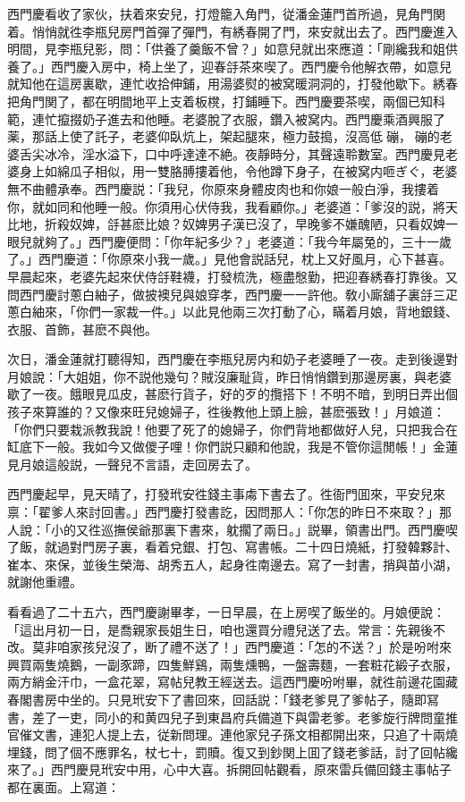 西門慶看收了家伙，扶着來安兒，打燈籠入角門，従潘金蓮門首所過，見角門関着。悄悄就徃李瓶兒房門首彈了彈門，有綉春開了門，來安就出去了。西門慶進入明間，見李瓶兒影，問：「供養了羹飯不曾？」如意兒就出來應道：「剛纔我和姐供養了。」西門慶入房中，椅上坐了，迎春㧱茶來喫了。西門慶令他解衣帶，如意兒就知他在這房裏歇，連忙收拾伸鋪，用湯婆熨的被窝暖洞洞的，打發他歇下。綉春把角門関了，都在明間地平上支着板櫈，打鋪睡下。西門慶要茶喫，兩個已知科範，連忙攛掇奶子進去和他睡。老婆脫了衣服，鑽入被窝内。西門慶乘酒興服了薬，那話上使了託子，老婆仰臥炕上，架起腿來，極力鼓搗，沒高低𢵞磞，𢵞磞的老婆舌尖冰冷，淫水溢下，口中呼達達不絶。夜靜時分，其聲遠聆數室。西門慶見老婆身上如綿瓜子相似，用一雙胳膊摟着他，令他蹲下身子，在被窝内咂ぎぐ，老婆無不曲體承奉。西門慶説：「我兒，你原來身體皮肉也和你娘一般白淨，我摟着你，就如同和他睡一般。你須用心伏侍我，我看顧你。」老婆道：「爹沒的説，將天比地，折殺奴婢，㧱甚麽比娘？奴婢男子漢已沒了，早晚爹不嫌醜陋，只看奴婢一眼兒就夠了。」西門慶便問：「你年紀多少？」老婆道：「我今年屬兔的，三十一歲了。」西門慶道：「你原來小我一歲。」見他會説話兒，枕上又好風月，心下甚喜。早晨起來，老婆先起來伏侍㧱鞋襪，打發梳洗，極盡慇勤，把迎春綉春打靠後。又問西門慶討蔥白紬子，做披襖兒與娘穿孝，西門慶一一許他。敎小廝舖子裏㧱三疋蔥白紬來，「你們一家裁一件。」以此見他兩三次打動了心，瞞着月娘，背地銀錢、衣服、首飾，甚麽不與他。

次日，潘金蓮就打聽得知，西門慶在李瓶兒房内和奶子老婆睡了一夜。走到後邊對月娘說：「大姐姐，你不説他幾句？賊沒廉耻貨，昨日悄悄鑽到那邊房裏，與老婆歇了一夜。餓眼見瓜皮，甚麽行貨子，好的歹的攬搭下！不明不暗，到明日弄出個孩子來算誰的？又像來旺兒媳婦子，徃後教他上頭上臉，甚麽張致！」月娘道：「你們只要栽派教我說！他要了死了的媳婦子，你們背地都做好人兒，只把我合在缸底下一般。我如今又做儍子哩！你們説只顧和他說，我是不管你這閒帳！」金蓮見月娘這般説，一聲兒不言語，走回房去了。

西門慶起早，見天晴了，打發玳安徃錢主事䖏下書去了。徃衙門囬來，平安兒來禀：「翟爹人來討回書。」西門慶打發書訖，因問那人：「你怎的昨日不來取？」那人說：「小的又徃巡撫侯爺那裏下書來，躭擱了兩日。」説畢，領書出門。西門慶喫了飯，就過對門房子裏，看着兌銀、打包、寫書帳。二十四日燒紙，打發韓夥計、崔本、來保，並後生榮海、胡秀五人，起身徃南邊去。寫了一封書，捎與苗小湖，就謝他重禮。

看看過了二十五六，西門慶謝畢孝，一日早晨，在上房喫了飯坐的。月娘便說：「這出月初一日，是喬親家長姐生日，咱也還買分禮兒送了去。常言：先親後不改。莫非咱家孩兒沒了，断了禮不送了！」西門慶道：「怎的不送？」於是吩咐來興買兩隻燒鵝，一副豕蹄，四隻鮮鷄，兩隻燻鴨，一盤壽麵，一套粧花緞子衣服，兩方綃金汗巾，一盒花翠，寫帖兒教王經送去。這西門慶吩咐畢，就徃前邊花園藏春閣書房中坐的。只見玳安下了書回來，回話説：「錢老爹見了爹帖子，隨即冩書，差了一吏，同小的和黄四兒子到東昌府兵備道下與雷老爹。老爹旋行牌問童推官催文書，連犯人提上去，従新問理。連他家兒子孫文相都開出來，只追了十兩燒埋錢，問了個不應罪名，杖七十，罰贖。復又到鈔関上囬了錢老爹話，討了回帖纔來了。」西門慶見玳安中用，心中大喜。拆開回帖觀看，原來雷兵備回錢主事帖子都在裏面。上寫道：

